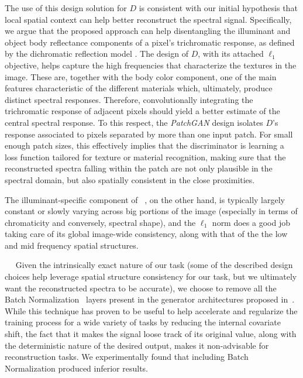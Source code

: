 \documentclass{bmvc2k}
\newcommand{\minisection}[1]{\vspace{0.04in} \noindent {\bf #1}\ \ }
\begin{document}
The use of this design solution for $D$ is consistent with our initial hypothesis that local spatial context can help better reconstruct the spectral signal. 
Specifically, we argue that the proposed approach can help disentangling the illuminant and object body reflectance components of a pixel's trichromatic response, as defined by the dichromatic reflection model \cite{shafer_using_1985}.
The design of $D$, with its attached $\ell_1$ objective, helps capture the high frequencies that characterize the textures in the image.
These are, together with the body color component, one of the main features characteristic of the different materials which, ultimately, produce distinct spectral responses. Therefore, convolutionally integrating the trichromatic response of adjacent pixels should yield a better estimate of the central spectral response. 
To this respect, the \emph{PatchGAN} design isolates $D$'s response associated to pixels separated by more than one input patch.
For small enough patch sizes, this effectively implies that the discriminator is learning a loss function tailored for texture or material recognition, making sure that the reconstructed spectra falling within the patch are not only plausible in the spectral domain, but also spatially consistent in the close proximities. 

The illuminant-specific component of ~\cite{shafer_using_1985}, on the other hand, is typically largely constant or slowly varying across big portions of the image (especially in terms of chromaticity and conversely, spectral shape), and the $\ell_1$ norm does a good job taking care of its global image-wide consistency, along with that of the the low and mid frequency spatial structures. 

\minisection{Avoiding Batch Normalization}
Given the intrinsically exact nature of our task (some of the described design choices help leverage spatial structure consistency for our task, but we ultimately want the reconstructed spectra to be accurate), we choose to remove all the Batch Normalization~\cite{ioffe_batch_2015} layers present in the generator architectures proposed in~\cite{pix2pix2016}.
While this technique has proven to be useful to help accelerate and regularize the training process for a wide variety of tasks by reducing the internal covariate shift, the fact that it makes the signal loose track of its original value, along with the deterministic nature of the desired output, makes it non-advisable for reconstruction tasks. 
We experimentally found that including Batch Normalization produced inferior results.
\end{document}
